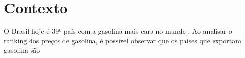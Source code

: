 \section{Contexto}
 
O Brasil hoje é 39º país com a gasolina mais cara no mundo \cite{oglobo}. Ao analisar o ranking dos preços de gasolina, é possível observar que os países que exportam gasolina são 

